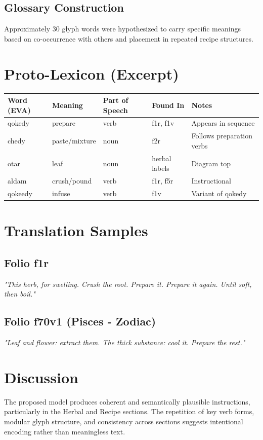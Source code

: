 \documentclass[12pt]{article}
\begin{document}
\subsection{Glossary Construction}
Approximately 30 glyph words were hypothesized to carry specific meanings based on co-occurrence with others and placement in repeated recipe structures.

\section{Proto-Lexicon (Excerpt)}
\begin{tabular}{lllll}
\toprule
\textbf{Word (EVA)} & \textbf{Meaning} & \textbf{Part of Speech} & \textbf{Found In} & \textbf{Notes} \\
\midrule
qokedy & prepare & verb & f1r, f1v & Appears in sequence \\
chedy & paste/mixture & noun & f2r & Follows preparation verbs \\
otar & leaf & noun & herbal labels & Diagram top \\
aldam & crush/pound & verb & f1r, f5r & Instructional \\
qokeedy & infuse & verb & f1v & Variant of qokedy \\
\bottomrule
\end{tabular}

\section{Translation Samples}
\subsection{Folio f1r}
\textit{"This herb, for swelling. Crush the root. Prepare it. Prepare it again. Until soft, then boil."}

\subsection{Folio f70v1 (Pisces - Zodiac)}
\textit{"Leaf and flower: extract them. The thick substance: cool it. Prepare the rest."}

\section{Discussion}
The proposed model produces coherent and semantically plausible instructions, particularly in the Herbal and Recipe sections. The repetition of key verb forms, modular glyph structure, and consistency across sections suggests intentional encoding rather than meaningless text.
\end{document}
